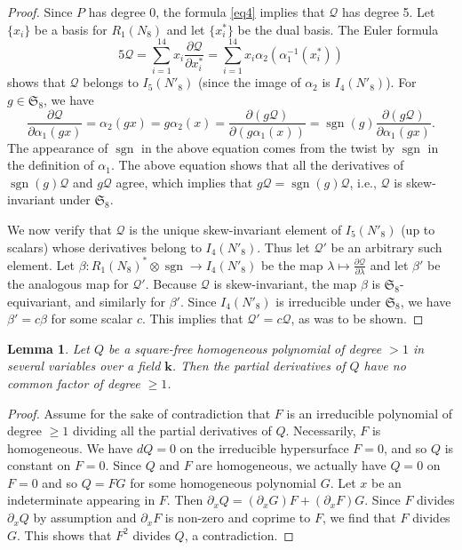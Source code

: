 \documentclass{amsart}
\newtheorem{lemma}[theorem]{Lemma}
\theoremstyle{definition}
\theoremstyle{remark}
\DeclareMathOperator{\sgn}{sgn}
\def\SS{\mathfrak{S}}
\def\fieldk{\mathbf{k}}
\def\quintic{\mathcal{Q}}
\begin{document}
\begin{proof}
Since $P$ has degree 0, the formula \eqref{eq4} implies that $\quintic$ has degree 5.  Let $\{x_i\}$ be a basis for
$R_1(N_8)$ and let $\{x_i^*\}$ be the dual basis.  The Euler formula
\begin{displaymath}
5 \quintic=\sum_{i=1}^{14} x_i \frac{\partial \quintic}{\partial x_i^*}=\sum_{i=1}^{14} x_i
\alpha_2(\alpha_1^{-1}(x_i^*))
\end{displaymath}
shows that $\quintic$ belongs to $I_5(N'_8)$ (since the image of $\alpha_2$ is $I_4(N'_8)$).  For $g \in \SS_8$, we
have
\begin{displaymath}
\frac{\partial \quintic}{\partial \alpha_1(gx)}=\alpha_2(gx)=g \alpha_2(x)=\frac{\partial (g \quintic)}{\partial
(g\alpha_1(x))}=\sgn(g) \frac{\partial (g \quintic)}{\partial \alpha_1(gx)}.
\end{displaymath}
The appearance of $\sgn$ in the above equation comes from the twist by $\sgn$ in the definition of $\alpha_1$.  The
above equation shows that all the derivatives of $\sgn(g) \quintic$ and $g \quintic$ agree, which implies that
$g \quintic=\sgn(g) \quintic$, i.e., $\quintic$ is skew-invariant under $\SS_8$.

We now verify that $\quintic$ is the unique skew-invariant element of $I_5(N'_8)$ (up to scalars) whose derivatives
belong to $I_4(N'_8)$.  Thus let $\quintic'$ be an arbitrary such element.  Let $\beta:R_1(N_8)^* \otimes \sgn
\to I_4(N'_8)$ be the map $\lambda \mapsto \frac{\partial \quintic}{\partial \lambda}$ and let $\beta'$ be the
analogous map for $\quintic'$.  Because $\quintic$ is skew-invariant, the map $\beta$ is $\SS_8$-equivariant, and
similarly for $\beta'$.  Since $I_4(N'_8)$ is irreducible under $\SS_8$, we
have $\beta'=c \beta$ for some scalar
$c$.  This implies that $\quintic'=c\quintic$, as was to be shown.
\end{proof}

\begin{lemma}
Let $Q$ be a square-free homogeneous polynomial of degree $>1$ in several variables over a field $\fieldk$.  Then the
partial derivatives of $Q$ have no common factor of degree $\ge 1$.
\end{lemma}

\begin{proof}
Assume for the sake of contradiction that $F$ is an irreducible polynomial of degree $\ge 1$ dividing all the partial
derivatives of $Q$.  Necessarily, $F$ is homogeneous.  We have $dQ=0$ on the irreducible hypersurface $F=0$, and so
$Q$ is constant on $F=0$.  Since $Q$ and $F$ are homogeneous, we actually have $Q=0$ on $F=0$ and so $Q=FG$ for some
homogeneous polynomial $G$.  Let $x$ be an indeterminate appearing in $F$.  Then $\partial_x Q=(\partial_x G)F+
(\partial_x F) G$.  Since $F$ divides $\partial_x Q$ by assumption and $\partial_x F$ is non-zero and coprime to $F$,
we find that $F$ divides $G$.  This shows that $F^2$ divides $Q$, a contradiction.
\end{proof}
\end{document}
